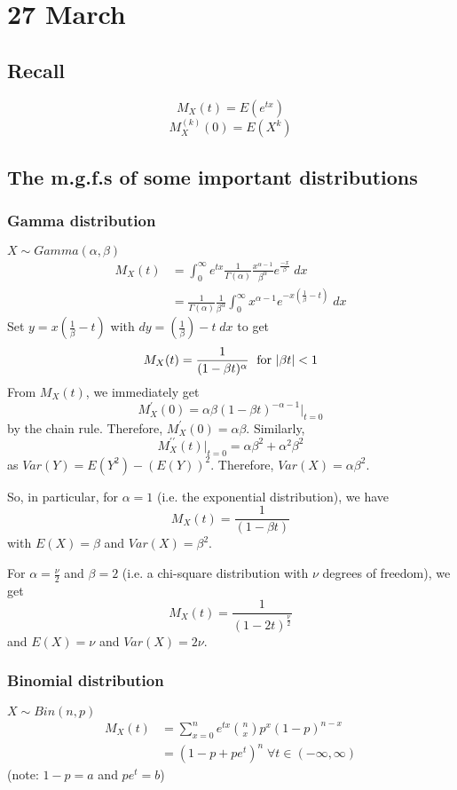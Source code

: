 \documentclass[12pt]{article}
\begin{document}
\section{27 March}
\subsection{Recall}
\[
    M_X (t) = E(e^{tx})
\]
\[
    M_X^{(k)} (0) = E(X^k)
\]
\subsection{The m.g.f.s of some important distributions}
\subsubsection{Gamma distribution}
$X \sim Gamma(\alpha,\beta)$
\begin{align*}
    M_X (t) &= \int_0^{\infty} e^{tx} \frac{1}{\Gamma(\alpha)} \frac{x^{\alpha -1}}{\beta^{\alpha}} e^{\frac{-x}{\beta}} \; dx \\
        &= \frac{1}{\Gamma(\alpha)} \frac{1}{\beta^{\alpha}} \int_0^{\infty} x^{\alpha - 1} e^{-x ( \frac{1}{\beta} - t)} \; dx 
\end{align*}
Set $y = x(\frac{1}{\beta} - t)$ with $dy = (\frac{1}{\beta}) - t \; dx$ to get
\[
    M_X (t) = \frac{1}{(1-\beta t)^{\alpha}} \; \textnormal{ for } |\beta t| < 1 
\]
From $M_X (t)$, we immediately get
\[
    M_X^{\prime} (0) = \alpha \beta (1 - \beta t)^{-\alpha - 1} \Big|_{t=0}
\]
by the chain rule. Therefore, $M_X^{\prime} (0) = \alpha \beta$. Similarly,
\[
    M_X^{\prime \prime} (t) \Big|_{t=0} = \alpha \beta^2 + \alpha^2 \beta^2
\]
as $Var(Y) = E(Y^2) - (E(Y))^2$. Therefore, $Var(X) = \alpha \beta^2$.

So, in particular, for $\alpha = 1$ (i.e. the exponential distribution), we have
\[
    M_X (t) = \frac{1}{(1-\beta t)}
\]
with $E(X) = \beta$ and $Var(X) = \beta^2$. 

For $\alpha = \frac{\nu}{2}$ and $\beta = 2$ (i.e. a chi-square distribution with $\nu$ degrees of freedom), we get
\[
    M_X (t) = \frac{1}{(1-2t)^{\frac{\nu}{2}}}
\]
and $E(X) = \nu$ and $Var(X) = 2 \nu$.

\subsubsection{Binomial distribution}
$X \sim Bin(n,p)$
\begin{align*}
    M_X (t) &= \sum_{x=0}^n e^{tx} {n \choose x} p^x (1-p)^{n-x} \\
        &= (1 - p + pe^t)^n \; \forall t \in (-\infty, \infty)
\end{align*}
(note: $1-p = a$ and $pe^t = b$)
\end{document}
